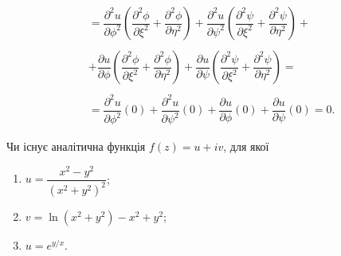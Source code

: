 \begin{solution}
\begin{align*}
        \\
        &= \dfrac{\partial^2 u}{\partial \phi^2} \left(\dfrac{\partial^2 \phi}{\partial \xi^2} + \dfrac{\partial^2 \phi}{\partial \eta^2}\right) + \dfrac{\partial^2 u}{\partial \psi^2} \left(\dfrac{\partial^2 \psi}{\partial \xi^2} + \dfrac{\partial^2 \psi}{\partial \eta^2}\right) + \\
        \\
        &+ \dfrac{\partial u}{\partial \phi} \left(\dfrac{\partial^2 \phi}{\partial \xi^2} + \dfrac{\partial^2 \phi}{\partial \eta^2}\right) + \dfrac{\partial u}{\partial \psi} \left(\dfrac{\partial^2 \psi}{\partial \xi^2} + \dfrac{\partial^2 \psi}{\partial \eta^2}\right) = \\
        \\
        &= \dfrac{\partial^2 u}{\partial \phi^2} (0) + \dfrac{\partial^2 u}{\partial \psi^2} (0) + \dfrac{\partial u}{\partial \phi} (0) + \dfrac{\partial u}{\partial \psi} (0) = 0.
    \end{align*}
\end{solution}

\begin{problem}[Волковиський, 164]
    Чи існує аналітична функція $f(z) = u + i v$, для якої
    \begin{enumerate}
        \item $u = \dfrac{x^2 - y^2}{(x^2 + y^2)^2}$;
        \item $v = \ln (x^2 + y^2) - x^2 + y^2$;
        \item $u = e^{y / x}$.
    \end{enumerate}
\end{problem}

